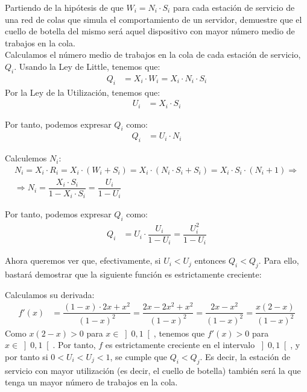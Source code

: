 \begin{comment}
\solucion
    El tiempo que debería transcurrir, de media, entre que un estudiante recibe la respuesta de este servidor hasta que vuelve a realizar una nueva petición es de 288 s.
\end{comment}
\begin{ejercicio}\label{ej:5.34}
    Partiendo de la hipótesis de que $W_i = N_i \cdot S_i$ para cada estación de servicio de una red de colas que simula el comportamiento de un servidor, demuestre que el cuello de botella del mismo será aquel dispositivo con mayor número medio de trabajos en la cola.\\

    Calculamos el número medio de trabajos en la cola de cada estación de servicio, $Q_i$. Usando la Ley de Little, tenemos que:
    \begin{align*}
        Q_i &= X_i \cdot W_i = X_i \cdot N_i \cdot S_i
    \end{align*}
    Por la Ley de la Utilización, tenemos que:
    \begin{align*}
        U_i &= X_i \cdot S_i
    \end{align*}

    Por tanto, podemos expresar $Q_i$ como:
    \begin{align*}
        Q_i &= U_i\cdot N_i
    \end{align*}

    Calculemos $N_i$:
    \begin{multline*}
        N_i = X_i\cdot R_i = X_i \cdot (W_i + S_i) = X_i \cdot (N_i \cdot S_i + S_i) = X_i \cdot S_i \cdot (N_i + 1)
        \Longrightarrow \\\Longrightarrow N_i = \dfrac{X_i \cdot S_i}{1 - X_i \cdot S_i} = \dfrac{U_i}{1 - U_i}
    \end{multline*}

    Por tanto, podemos expresar $Q_i$ como:
    \begin{align*}
        Q_i &= U_i \cdot \dfrac{U_i}{1 - U_i} = \dfrac{U_i^2}{1 - U_i}
    \end{align*}

    Ahora queremos ver que, efectivamente, si $U_i<U_j$ entonces $Q_i<Q_j$. Para ello, bastará demostrar que la siguiente función es estrictamente creciente:
    \Func{f}{[0,1[}{\bb{R}}{x}{\frac{x^2}{1-x}}

    Calculamos su derivada:
    \begin{align*}
        f'(x) &= \dfrac{(1-x)\cdot 2x +x^2}{(1-x)^2} = \dfrac{2x - 2x^2 + x^2}{(1-x)^2} = \dfrac{2x - x^2}{(1-x)^2} = \dfrac{x(2-x)}{(1-x)^2}
    \end{align*}
    Como $x(2-x) > 0$ para $x \in \left]0, 1\right[$, tenemos que $f'(x) > 0$ para $x \in \left]0, 1\right[$. Por tanto, $f$ es estrictamente creciente en el intervalo $\left]0, 1\right[$, y por tanto si $0 < U_i < U_j < 1$, se cumple que $Q_i < Q_j$. Es decir, la estación de servicio con mayor utilización (es decir, el cuello de botella) también será la que tenga un mayor número de trabajos en la cola.
\end{ejercicio}

